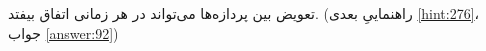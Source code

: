 \section{}
\paragraph{}\label{hint:132}
تعویض بین پردازه‌ها می‌تواند در هر زمانی اتفاق بیفتد. (راهنماییِ بعدی \ref{hint:276}، جواب \ref{answer:92})
